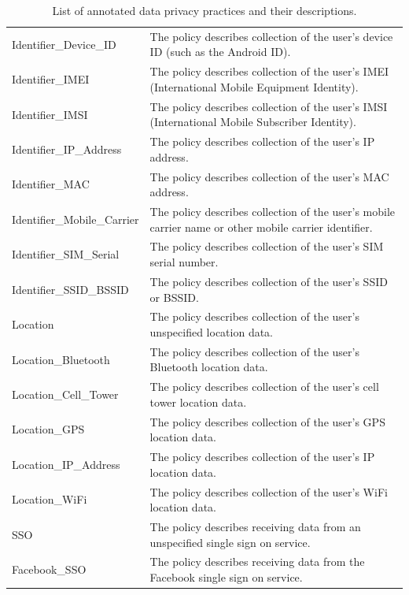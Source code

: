 \begin{table}[]
{\begin{tabular}{ll}
	Identifier\_Device\_ID    & The policy describes collection of the user's device ID (such as the Android ID).              \\
	Identifier\_IMEI          & The policy describes collection of the user's IMEI (International Mobile Equipment Identity).  \\
	Identifier\_IMSI          & The policy describes collection of the user's IMSI (International Mobile Subscriber Identity). \\
	Identifier\_IP\_Address   & The policy describes collection of the user's IP address.                                      \\
	Identifier\_MAC           & The policy describes collection of the user's MAC address.                                     \\
	Identifier\_Mobile\_Carrier           & The policy describes collection of the user's mobile carrier name or other mobile carrier identifier.          \\
	Identifier\_SIM\_Serial   & The policy describes collection of the user's SIM serial number.                               \\
	Identifier\_SSID\_BSSID   & The policy describes collection of the user's SSID or BSSID.                                   \\
	Location                  & The policy describes collection of the user's unspecified location data.                       \\
	Location\_Bluetooth       & The policy describes collection of the user's Bluetooth location data.                         \\
	Location\_Cell\_Tower     & The policy describes collection of the user's cell tower location data.                        \\
	Location\_GPS             & The policy describes collection of the user's GPS location data.                               \\
	Location\_IP\_Address     & The policy describes collection of the user's IP location data.                                \\
	Location\_WiFi            & The policy describes collection of the user's WiFi location data.                              \\
	SSO                       & The policy describes receiving data from an unspecified single sign on service.                \\
	Facebook\_SSO             & The policy describes receiving data from the Facebook single sign on service.                 
	\end{tabular}%
	}
	\caption{List of annotated data privacy practices and their descriptions.}
	\end{table}


